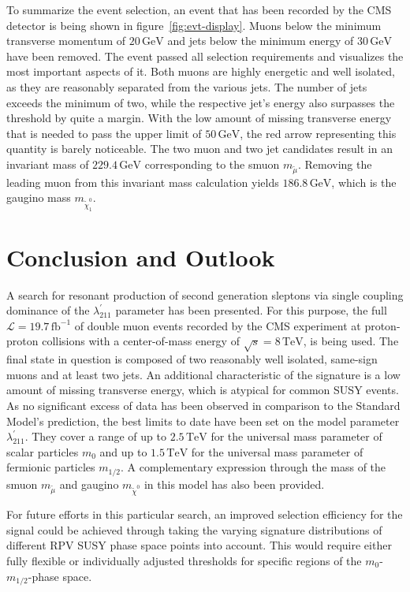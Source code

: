 \noindent To summarize the event selection, an event that has been recorded by the CMS detector is being shown in figure~\ref{fig:evt-display}. Muons below the minimum transverse momentum of $20\,\text{GeV}$ and jets below the minimum energy of $30\,\text{GeV}$ have been removed. The event passed all selection requirements and visualizes the most important aspects of it. Both muons are highly energetic and well isolated, as they are reasonably separated from the various jets. The number of jets exceeds the minimum of two, while the respective jet's energy also surpasses the threshold by quite a margin. With the low amount of missing transverse energy that is needed to pass the upper limit of $50\,\text{GeV}$, the red arrow representing this quantity is barely noticeable. The two muon and two jet candidates result in an invariant mass of $229.4\,\text{GeV}$ corresponding to the smuon $m_{\tilde{\mu}}$. Removing the leading muon from this invariant mass calculation yields $186.8\,\text{GeV}$, which is the gaugino mass $m_{\tilde{\chi}^0_1}$.  

\section{Conclusion and Outlook}
\label{sec:conclusion}

A search for resonant production of second generation sleptons via single coupling dominance of the $\lambda^{\prime}_{211}$ parameter has been presented. For this purpose, the full $\mathcal{L} = 19.7\,\text{fb}^{-1}$ of double muon events recorded by the CMS experiment at proton-proton collisions with a center-of-mass energy of $\sqrt{s} = 8\,\text{TeV}$, is being used. The final state in question is composed of two reasonably well isolated, same-sign muons and at least two jets. An additional characteristic of the signature is a low amount of missing transverse energy, which is atypical for common SUSY events. As no significant excess of data has been observed in comparison to the Standard Model's prediction, the best limits to date have been set on the model parameter $\lambda^{\prime}_{211}$. They cover a range of up to $2.5\,\text{TeV}$ for the universal mass parameter of scalar particles $m_0$ and up to $1.5\,\text{TeV}$ for the universal mass parameter of fermionic particles $m_{1/2}$. A complementary expression through the mass of the smuon $m_{\tilde{\mu}}$ and gaugino $m_{\tilde{\chi}^0}$ in this model has also been provided.

For future efforts in this particular search, an improved selection efficiency for the signal could be achieved through taking the varying signature distributions of different RPV SUSY phase space points into account. This would require either fully flexible or individually adjusted thresholds for specific regions of the $m_0$-$m_{1/2}$-phase space.

